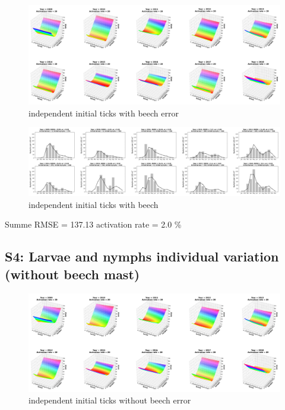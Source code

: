 \documentclass[a4paper, 11pt]{scrartcl}
\begin{document}
\begin{figure}[h!]
\centering
\includegraphics[width=1.0\textwidth]{figures/independent_initial_ticks_with_beech_error.PNG}
\caption{independent initial ticks with beech error}
\label{fig:independent_initial_ticks_with_beech_error}
\end{figure}

\begin{figure}[h!]
\centering
\includegraphics[width=1.0\textwidth]{figures/independent_initial_ticks_with_beech.PNG}
\caption{independent initial ticks with beech}
\label{fig:independent_initial_ticks_with_beech}
\end{figure}

Summe RMSE = 137.13
activation rate = 2.0 \%

\newpage
\subsection{S4: Larvae and nymphs individual variation (without beech mast)}


\begin{figure}[h!]
\centering
\includegraphics[width=1.0\textwidth]{figures/independent_initial_ticks_without_beech_error.PNG}
\caption{independent initial ticks without beech error}
\label{fig:independent_initial_ticks_without_beech_error}
\end{figure}
\end{document}
